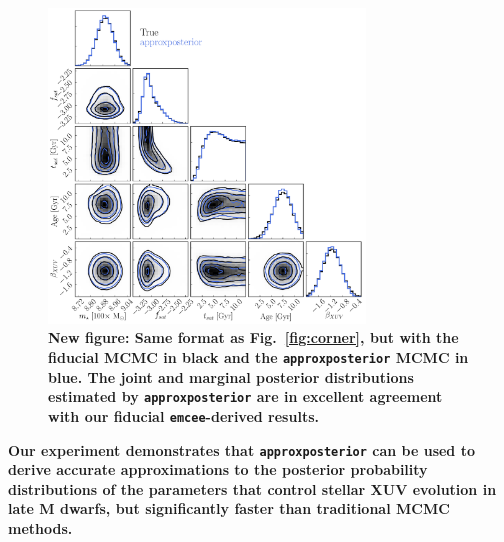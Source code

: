 \documentclass[twocolumn]{aastex62}
\newcommand{\xxx}[1]{{\textbf{#1}}}
\newcommand{\emcee}[0]{\texttt{emcee}\xspace}
\newcommand{\approxposterior}[0]{\texttt{approxposterior}\xspace}
\begin{document}
\begin{figure}[t]
\centering
	\includegraphics[width=0.75\textwidth]{../Analysis/Approx/stacked.pdf}
   \caption{\xxx{New figure: Same format as Fig.~\ref{fig:corner}, but with the fiducial MCMC in black and the \approxposterior MCMC in blue. \textbf{The joint and marginal posterior distributions estimated by \approxposterior are in excellent agreement with our fiducial \emcee-derived results.}}}%
    \label{fig:stacked}%
\end{figure}

\xxx{Our experiment demonstrates that \approxposterior can be used to derive accurate approximations to the posterior probability distributions of the parameters that control stellar XUV evolution in late M dwarfs, but significantly faster than traditional MCMC methods.}

\end{document}
